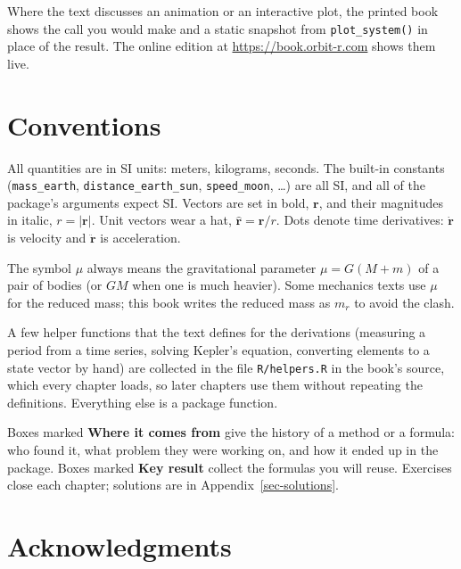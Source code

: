 \documentclass[
  10.5pt,
  letterpaper,
]{scrbook}
\theoremstyle{definition}
\theoremstyle{plain}
\theoremstyle{remark}
\begin{document}
Where the text discusses an animation or an interactive plot, the
printed book shows the call you would make and a static snapshot from
\texttt{plot\_system()} in place of the result. The online edition at
\url{https://book.orbit-r.com} shows them live.

\section*{Conventions}\label{conventions}


All quantities are in SI units: meters, kilograms, seconds. The built-in
constants (\texttt{mass\_earth}, \texttt{distance\_earth\_sun},
\texttt{speed\_moon}, \ldots) are all SI, and all of the package's
arguments expect SI. Vectors are set in bold, \(\mathbf{r}\), and their
magnitudes in italic, \(r = |\mathbf{r}|\). Unit vectors wear a hat,
\(\hat{\mathbf{r}} = \mathbf{r}/r\). Dots denote time derivatives:
\(\dot{\mathbf{r}}\) is velocity and \(\ddot{\mathbf{r}}\) is
acceleration.

The symbol \(\mu\) always means the gravitational parameter
\(\mu = G(M + m)\) of a pair of bodies (or \(GM\) when one is much
heavier). Some mechanics texts use \(\mu\) for the reduced mass; this
book writes the reduced mass as \(m_r\) to avoid the clash.

A few helper functions that the text defines for the derivations
(measuring a period from a time series, solving Kepler's equation,
converting elements to a state vector by hand) are collected in the file
\texttt{R/helpers.R} in the book's source, which every chapter loads, so
later chapters use them without repeating the definitions. Everything
else is a package function.

Boxes marked \textbf{Where it comes from} give the history of a method
or a formula: who found it, what problem they were working on, and how
it ended up in the package. Boxes marked \textbf{Key result} collect the
formulas you will reuse. Exercises close each chapter; solutions are in
Appendix~\ref{sec-solutions}.

\section*{Acknowledgments}\label{acknowledgments}

\end{document}
